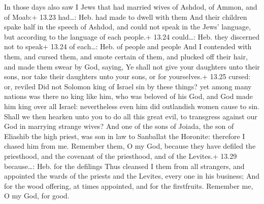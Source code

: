  In those days also saw I Jews that had married wives of
Ashdod, of Ammon, and of Moab:+ 13.23 had\ldots: Heb. had made to dwell
with them  And their children spake half in the speech of
Ashdod, and could not speak in the Jews' language, but according to the
language of each people.+ 13.24 could\ldots: Heb. they discerned not to
speak+ 13.24 of each\ldots: Heb. of people and people 
And I contended with them, and cursed them, and smote certain of them,
and plucked off their hair, and made them swear by God, saying, Ye shall
not give your daughters unto their sons, nor take their daughters unto
your sons, or for yourselves.+ 13.25 cursed: or, reviled 
Did not Solomon king of Israel sin by these things? yet among many
nations was there no king like him, who was beloved of his God, and God
made him king over all Israel: nevertheless even him did outlandish
women cause to sin.  Shall we then hearken unto you to do
all this great evil, to transgress against our God in marrying strange
wives?  And one of the sons of Joiada, the son of
Eliashib the high priest, was son in law to Sanballat the Horonite:
therefore I chased him from me.  Remember them, O my God,
because they have defiled the priesthood, and the covenant of the
priesthood, and of the Levites.+ 13.29 because\ldots: Heb. for the
defilings  Thus cleansed I them from all strangers, and
appointed the wards of the priests and the Levites, every one in his
business;  And for the wood offering, at times appointed,
and for the firstfruits. Remember me, O my God, for good.
